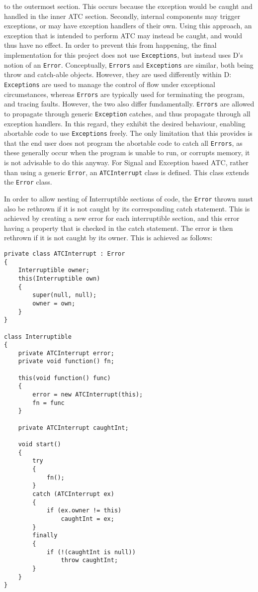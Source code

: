 to the outermost section. This occurs because the exception would be caught and
handled in the inner ATC section. 
Secondly, internal components may trigger exceptions, or may have exception handlers 
of their own. Using this approach, an exception that is intended to perform ATC 
may instead be caught, and would thus have no effect. 
In order to prevent this from happening, the final implementation for this
project does not use \texttt{Exceptions}, but instead uses D's notion of an
\texttt{Error}. Conceptually, \texttt{Errors} and \texttt{Exceptions} are
similar, both being throw and catch-able objects. 
However, they are used differently within D: \texttt{Exceptions} are used to
manage the control of flow under exceptional circumstances, whereas
\texttt{Errors} are typically used for terminating the program, and tracing faults. 
However, the two also differ fundamentally. 
\texttt{Errors} are allowed to propagate through generic \texttt{Exception} catches, and thus propagate 
through all exception handlers. In this regard, they exhibit the desired
behaviour, enabling abortable code to use \texttt{Exceptions} freely. The only
limitation that this provides is that the end user does not program the
abortable code to catch all \texttt{Errors}, as these generally occur when the
program is unable to run, or corrupts memory, it is not advisable to do this
anyway. For Signal and Exception based ATC, rather than using a generic
\texttt{Error}, an \texttt{ATCInterrupt} class is defined. 
This class extends the \texttt{Error} class.
\par\bigskip\noindent
In order to allow nesting of Interruptible sections of code, the \texttt{Error} thrown
must also be rethrown if it is not caught by its corresponding catch statement. 
This is achieved by creating a new error for each interruptible section, and
this error having a property that is checked in the catch statement. The error
is then rethrown if it is not caught by its owner. 
This is achieved as follows: 
\begin{lstlisting}
private class ATCInterrupt : Error
{
    Interruptible owner;
    this(Interruptible own)
    {
        super(null, null);
        owner = own;
    }
}

class Interruptible
{
    private ATCInterrupt error; 
    private void function() fn; 

    this(void function() func)
    {
        error = new ATCInterrupt(this); 
        fn = func
    }

    private ATCInterrupt caughtInt;

    void start()
    {
        try
        {
            fn();
        }
        catch (ATCInterrupt ex)
        {
            if (ex.owner != this)
                caughtInt = ex;
        }
        finally
        {
            if (!(caughtInt is null))
                throw caughtInt;
        }
    }
}
\end{lstlisting}
